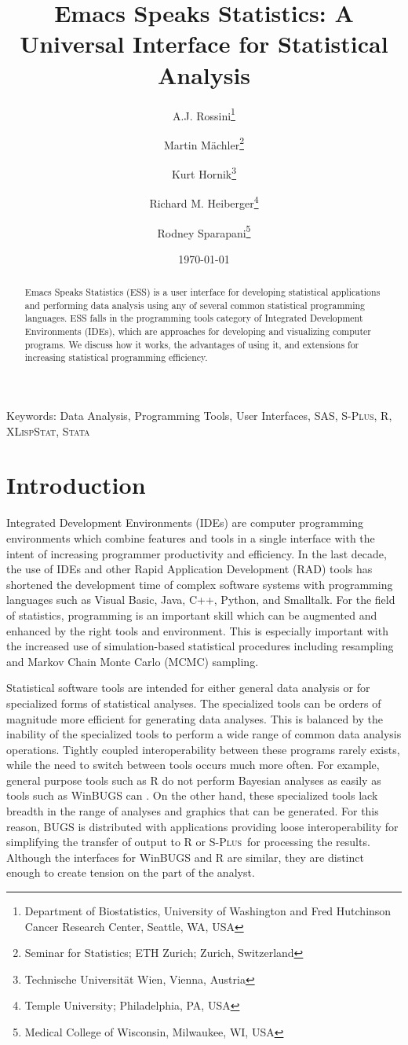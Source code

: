 \documentclass{article}
\title{Emacs Speaks Statistics: A Universal Interface for
  Statistical Analysis}
\author{A.J. Rossini\footnote{Department of Biostatistics, University
    of Washington and Fred Hutchinson Cancer Research Center, Seattle,
    WA, USA} \and Martin M{\"a}chler\footnote{Seminar for Statistics;
    ETH Zurich; Zurich, Switzerland} \and Kurt
  Hornik\footnote{Technische Universit{\"a}t Wien, Vienna, Austria}
  \and Richard M. Heiberger\footnote{Temple University; Philadelphia,
    PA, USA} \and Rodney Sparapani\footnote{Medical College of
    Wisconsin, Milwaukee, WI, USA}}
\date{\today}
\newif\ifpdf
\newcommand*{\Splus}{\textsc{S-Plus}}
\newcommand*{\XLispStat}{\textsc{XLispStat}}
\newcommand*{\Stata}{\textsc{Stata}}
\begin{document}
\ifpdf
  \DeclareGraphicsExtensions{.jpg,.pdf,.png,.mps}
\fi


\singlespace

\maketitle

Keywords: Data Analysis, Programming Tools, User Interfaces, SAS,
\Splus, R, \XLispStat, \Stata

\begin{abstract}
  Emacs Speaks Statistics (ESS) is a user interface for developing
  statistical applications and performing data analysis using any of
  several common statistical programming languages.  ESS falls in the
  programming tools category of Integrated Development Environments
  (IDEs), which are approaches for developing and visualizing computer
  programs.  We discuss how it works, the advantages of using it, and
  extensions for increasing statistical programming efficiency.
\end{abstract}

\doublespace

\section{Introduction}
\label{sec:intro}

Integrated Development Environments (IDEs) are computer programming
environments which combine features and tools in a single interface
with the intent of increasing programmer productivity and efficiency.
In the last decade, the use of IDEs and other Rapid Application
Development (RAD) tools has shortened the development time of complex
software systems with programming languages such as Visual Basic,
Java, C++, Python, and Smalltalk.  For the field of statistics,
programming is an important skill which can be augmented and enhanced
by the right tools and environment.  This is especially important with
the increased use of simulation-based statistical procedures including
resampling and Markov Chain Monte Carlo (MCMC) sampling.

Statistical software tools are intended for either general data
analysis or for specialized forms of statistical analyses.  The
specialized tools can be orders of magnitude more efficient for
generating data analyses.  This is balanced by the inability of the
specialized tools to perform a wide range of common data analysis
operations.  Tightly coupled interoperability between these programs
rarely exists, while the need to switch between tools occurs much more
often.  For example, general purpose tools such as R
\citep{ihak:gent:1996} do not perform Bayesian analyses as easily as
tools such as WinBUGS can \citep{SpieThomBest:1999}.  On the other
hand, these specialized tools lack breadth in the range of analyses
and graphics that can be generated.  For this reason, BUGS is
distributed with applications providing loose interoperability for
simplifying the transfer of output to R or \Splus\ for processing the
results.  Although the interfaces for WinBUGS and R are similar,
they are distinct enough to create tension on the part of the
analyst.
\end{document}
